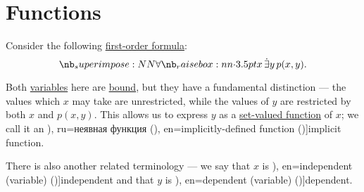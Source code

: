 \section{Functions}\label{sec:functions}

\begin{concept}\label{con:variable_dependence}
  Consider the following \hyperref[def:first_order_syntax/formula]{first-order formula}:
  \begin{equation*}
    \qforall x \qexists y p(x, y).
  \end{equation*}

  Both \hyperref[con:variable]{variables} here are \hyperref[con:variable_binding]{bound}, but they have a fundamental distinction --- the values which \( x \) may take are unrestricted, while the values of \( y \) are restricted by both \( x \) and \( p(x, y) \). This allows us to express \( y \) as a \hyperref[def:function]{set-valued function} of \( x \); we call it an \term[bg=неявна функция (\cite[377]{Тагамлицки1971ДиференциалноСмятане}), ru=неявная функция (\cite[314]{Фихтенгольц1968ОсновыАнализаТом2}), en=implicitly-defined function (\cite[29]{DontchevRockafellar2014SolutionMappings})]{implicit function}.

  There is also another related terminology --- we say that \( x \) is \term[ru=независимая (переменная) (\cite[145]{Гончаров1952ФункцииДействительногоПеременного}), en=independent (variable) (\cite[74]{Kleene2002Logic})]{independent} and that \( y \) is \term[ru=зависимая (переменная) (\cite[145]{Гончаров1952ФункцииДействительногоПеременного}), en=dependent (variable) (\cite[74]{Kleene2002Logic})]{dependent}.
\end{concept}

